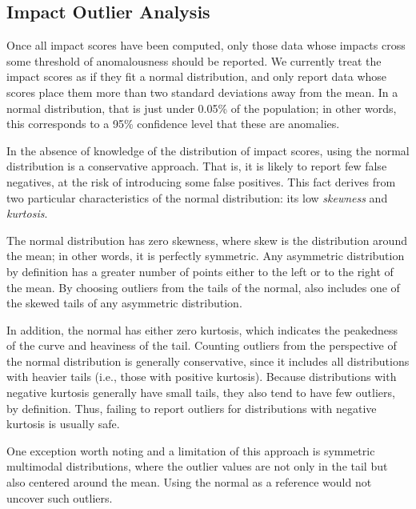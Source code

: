 \subsection{Impact Outlier Analysis}
\label{sec:outlier_analysis}

Once all impact scores have been computed, only those data whose
impacts cross some threshold of anomalousness should be
reported. We currently treat the impact scores as if they fit a normal
distribution, and only report data whose scores place them more
than two standard deviations away from the mean. In a normal
distribution, that is just under 0.05\% of the population; in other
words, this corresponds to a 95\% confidence level that these are
anomalies.

In the absence of knowledge of the distribution of impact scores, using
the normal distribution is a conservative approach. That is, it
is likely to report few false negatives, at the risk of introducing some false
positives. This fact derives from two particular characteristics of the
normal distribution: its low \emph{skewness} and \emph{kurtosis}.

The normal distribution has zero skewness, where skew is the
distribution around the mean; in other words, it is perfectly
symmetric. Any asymmetric distribution by definition has a greater
number of points either to the left or to the right of the mean. By
choosing outliers from the tails of the normal, \checkcell{} also
includes one of the skewed tails of any asymmetric distribution.

In addition, the normal has either zero kurtosis, which indicates the
peakedness of the curve and heaviness of the tail. Counting outliers
from the perspective of the normal distribution is generally
conservative, since it includes all distributions with heavier tails
(i.e., those with positive kurtosis). Because distributions with negative
kurtosis generally have small tails, they also tend to have few
outliers, by definition. Thus, failing to report outliers for
distributions with negative kurtosis is usually safe.

One exception worth noting and a limitation of this approach is
symmetric multimodal distributions, where the outlier values are not only
in the tail but also centered around the mean. Using the normal as a
reference would not uncover such outliers.

